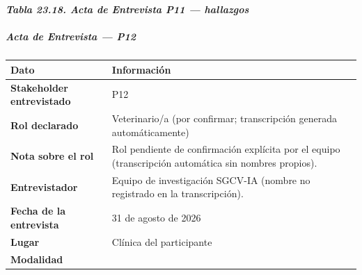 \documentclass[
]{article}
\newcounter{none} %
\begin{document}
\protect{}\label{_bookmark_P11_hallazgos}{}\emph{\textbf{Tabla 23.18. Acta de Entrevista P11 --- hallazgos}}

\subparagraph{Acta de Entrevista --- P12}\label{acta-entrevista-p12}

{\def\LTcaptype{none} %
\begin{longtable}[]{|
  >{\raggedright\arraybackslash}p{}|
  >{\raggedright\arraybackslash}p{}|}
\hline
\begin{minipage}[b]{\linewidth}\centering
\textbf{Dato}
\end{minipage} & \begin{minipage}[b]{\linewidth}\centering
\textbf{Información}
\end{minipage} \\
\hline
\endhead
\hline
\endlastfoot
\textbf{Stakeholder entrevistado} & \begin{minipage}[t]{\linewidth}\raggedright
P12
\end{minipage} \\
\hline
\textbf{Rol declarado} & \begin{minipage}[t]{\linewidth}\raggedright
Veterinario/a (por confirmar; transcripción generada automáticamente)
\end{minipage} \\
\hline
\textbf{Nota sobre el rol} & \begin{minipage}[t]{\linewidth}\raggedright
Rol pendiente de confirmación explícita por el equipo (transcripción automática sin nombres propios).
\end{minipage} \\
\hline
\textbf{Entrevistador} & \begin{minipage}[t]{\linewidth}\raggedright
Equipo de investigación SGCV-IA (nombre no registrado en la transcripción).
\end{minipage} \\
\hline
\textbf{Fecha de la entrevista} & \begin{minipage}[t]{\linewidth}\raggedright
31 de agosto de 2026
\end{minipage} \\
\hline
\textbf{Lugar} & \begin{minipage}[t]{\linewidth}\raggedright
Clínica del participante
\end{minipage} \\
\hline
\textbf{Modalidad} & \begin{minipage}[t]{\linewidth}\raggedright

\end{minipage}
\end{longtable}}
\end{document}
